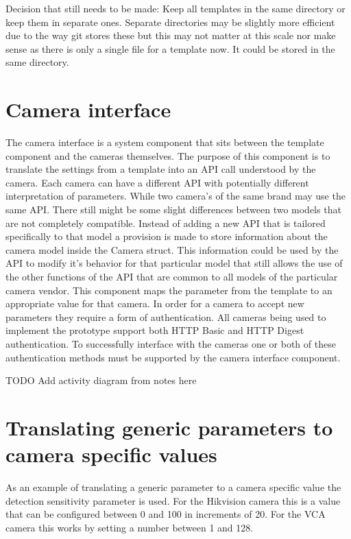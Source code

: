 Decision that still needs to be made:
Keep all templates in the same directory or keep them in separate ones.
Separate directories may be slightly more efficient due to the way git stores these but this may not matter at this scale nor make sense as there is only a single file for a template now.
It could be stored in the same directory.

\section{Camera interface}
The camera interface is a system component that sits between the template component and the cameras themselves. The purpose of this component
is to translate the settings from a template into an API call understood by the camera. Each camera can have a different API with potentially different interpretation of parameters.
While two camera's of the same brand may use the same API.
There still might be some slight differences between two models that are not completely compatible.
Instead of adding a new API that is tailored specifically to that model a provision is made to store information about the camera model inside the Camera struct.
This information could be used by the API to modify it's behavior for that particular model that still allows the use of the other functions of the API that are common to all models of the particular camera vendor.
This component maps the parameter from the template to an appropriate value for that camera.
In order for a camera to accept new parameters they require a form of authentication. All cameras being used to implement the prototype support both HTTP Basic and HTTP Digest authentication.
To successfully interface with the cameras one or both of these authentication methods must be supported by the camera interface component.

TODO Add activity diagram from notes here

\section{Translating generic parameters to camera specific values}
As an example of translating a generic parameter to a camera specific value the detection sensitivity parameter is used.
For the Hikvision camera this is a value that can be configured between 0 and 100 in increments of 20.
For the VCA camera this works by setting a number between 1 and 128.

